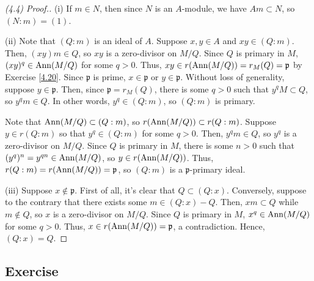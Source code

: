 \begin{proof}[(4.4) Proof.]
(i) If $m \in N$, then since $N$ is an $A$-module, we have $Am \subset N$, so $(N:m) = (1)$.

(ii) Note that $(Q:m)$ is an ideal of $A$. Suppose $x, y \in A$ and $x y \in (Q:m)$. Then, $(xy)m \in Q$, so $xy$ is a zero-divisor on $M/Q$. Since $Q$ is primary in $M$,
$(xy)^q \in \operatorname{Ann}(M/Q)$ for some $q > 0$. Thus, $xy \in r(\operatorname{Ann}(M/Q)) = r_M(Q) = \mathfrak{p}$ by Exercise \ref{4.20}. Since $\mathfrak{p}$ is prime, $x \in \mathfrak{p}$ or
$y \in \mathfrak{p}$. Without loss of generality, suppose $y \in \mathfrak{p}$. Then, since $\mathfrak{p} = r_M(Q)$, there is some $q > 0$ such that $y^q M \subset Q$, so $y^q m \in Q$.
In other words, $y^q \in (Q:m)$, so $(Q:m)$ is primary. 

Note that $\operatorname{Ann}(M/Q) \subset (Q:m)$, so $r(\operatorname{Ann}(M/Q)) \subset r(Q:m)$. Suppose $y \in r(Q:m)$ so that $y^q \in (Q:m)$ for some $q > 0$. Then, $y^q m \in Q$, so $y^q$ is a zero-divisor on $M/Q$.
Since $Q$ is primary in $M$, there is some $n > 0$ such that $(y^q)^n = y^{qn} \in \operatorname{Ann}(M/Q)$, so $y \in r(\operatorname{Ann}(M/Q))$. Thus, $r(Q:m) = r(\operatorname{Ann}(M/Q)) = \mathfrak{p}$, so $(Q:m)$ is a 
$\mathfrak{p}$-primary ideal.

(iii) Suppose $x \not\in \mathfrak{p}$. First of all, it's clear that $Q \subset (Q:x)$. Conversely, suppose to the contrary that there exists some $m \in (Q:x) - Q$. Then,
$xm \subset Q$ while $m \not\in Q$, so $x$ is a zero-divisor on $M/Q$. Since $Q$ is primary in $M$, $x^q \in \operatorname{Ann}(M/Q)$ for some $q > 0$. Thus, $x \in r(\operatorname{Ann}(M/Q)) = \mathfrak{p}$,
a contradiction. Hence, $(Q:x) = Q$.
\end{proof}

\subsection{Exercise}\label{4.22}

